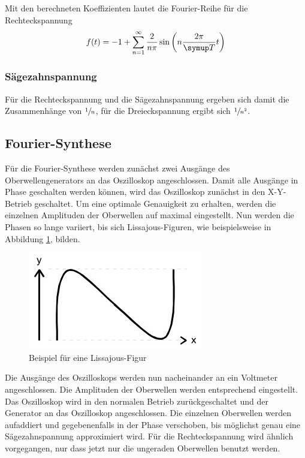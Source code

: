 Mit den berechneten Koeffizienten lautet die Fourier-Reihe für die Rechteckspannung
\begin{equation}
  f(t) = -1 + \sum_{n=1}^\infty{\frac{2}{n\pi}\sin{\left(n\frac{2\pi}{\su{T}}t\right)}}
\end{equation}
\subsubsection{Sägezahnspannung}

\par
\noindent Für die Rechteckspannung und die Sägezahnspannung ergeben sich damit die Zusammenhänge
von $\sfrac{1}{n}$, für die Dreieckspannung ergibt sich $\sfrac{1}{n^2}$.
\subsection{Fourier-Synthese}
Für die Fourier-Synthese werden zunächst zwei Ausgänge des Oberwellengenerators
an das Oszilloskop angeschlossen. Damit alle Ausgänge in Phase geschalten werden
können, wird das Oszilloskop zunächst in den X-Y-Betrieb geschaltet. Um eine
optimale Genauigkeit zu erhalten, werden die einzelnen Amplituden der Oberwellen
auf maximal eingestellt. Nun werden die Phasen so lange variiert, bis sich
Lissajous-Figuren, wie beispielsweise in Abbildung \ref{lissa}, bilden.
\begin{figure}[H]
  \centering
  \includegraphics{bilder/lissajous.jpg}
  \caption{Beispiel für eine Lissajous-Figur}
  \label{lissa}
\end{figure}
Die Ausgänge des Oszilloskops werden nun nacheinander an ein Voltmeter
angeschlossen. Die Amplituden der Oberwellen werden entsprechend eingestellt.
Das Oszilloskop wird in den normalen Betrieb zurückgeschaltet und der Generator
an das Oszilloskop angeschlossen. Die einzelnen Oberwellen werden aufaddiert und
gegebenenfalls in der Phase verschoben, bis möglichst genau eine Sägezahnspannung
approximiert wird.
Für die Rechteckspannung wird ähnlich vorgegangen, nur dass jetzt nur die
ungeraden Oberwellen benutzt werden.

